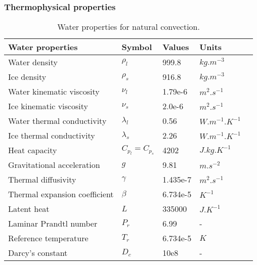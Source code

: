 \subsubsection*{Thermophysical properties}
\begin{table}[h!]
	\begin{tabular}{@{}lllll@{}}
		\toprule[1pt]
		\textbf{Water properties} & \textbf{Symbol} & \textbf{Values} & \textbf{Units} &  \\ \midrule[2pt]
		Water density & $\rho_l$ & 999.8 & $kg.m^{-3}$ \\
		Ice density & $\rho_s$ & 916.8 & $kg.m^{-3}$ \\		
		Water kinematic viscosity & $\nu_{l}$ & 1.79e-6 & $m^{2}.s^{-1}$ \\
		Ice kinematic viscosity & $\nu_{s}$ & 2.0e-6 & $m^{2}.s^{-1}$ \\		
		Water thermal conductivity & $\lambda_{l}$ & 0.56 & $W.m^{-1}.K^{-1}$ \\
		Ice thermal conductivity & $\lambda_{s}$ & 2.26 & $W.m^{-1}.K^{-1}$ \\		
		Heat capacity & $C_{p_{l}}=C_{p_{s}}$ & 4202 & $J.kg.K^{-1}$ \\		 
		Gravitational acceleration & $g$ &  9.81  & $m.s^{-2}$ \\
		Thermal diffusivity & $\gamma$ &  1.435e-7  & $m^{2}.s^{-1}$ \\		
		Thermal expansion coefficient & $\beta$ &  6.734e-5  & $K^{-1}$ \\
		Latent heat & $L$ &  335000  & $J.K^{-1}$ \\			
		Laminar Prandtl number & $P_r$ &  6.99  & - \\
		Reference temperature & $T_r$ &  6.734e-5  & $K$ \\
		Darcy's constant & $D_c$ &  10e8  & - \\		 \bottomrule[1pt]		
	\end{tabular}
	\centering
	\caption{Water properties for natural convection.}	
	\label{fig:waterProperties}
\end{table}

